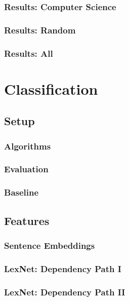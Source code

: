 \documentclass[11pt,aspectratio=169]{beamer}
\begin{document}
    \begin{frame}
        \frametitle{Results: Computer Science}

    \end{frame}

    \begin{frame}
        \frametitle{Results: Random}

    \end{frame}


    \begin{frame}
        \frametitle{Results: All}

    \end{frame}

    \section{Classification}
    \frame{\sectionpage}
    \subsection{Setup}
    \begin{frame}
        \frametitle{Algorithms}

    \end{frame}

    \begin{frame}
        \frametitle{Evaluation}

    \end{frame}

    \begin{frame}
        \frametitle{Baseline}

    \end{frame}

    \subsection{Features}
    \begin{frame}
        \frametitle{Sentence Embeddings}

    \end{frame}

    \begin{frame}
        \frametitle{LexNet: Dependency Path I}

    \end{frame}


    \begin{frame}
        \frametitle{LexNet: Dependency Path II}

    \end{frame}
\end{document}
